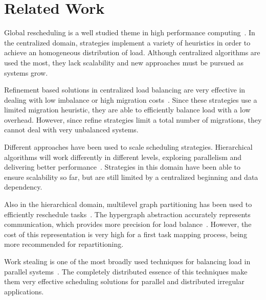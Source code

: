 \section{Related Work} \label{sec:rw}


Global rescheduling is a well studied theme in high performance computing~\cite{Deveci2015,grapevine,nuco,hybrid,ZoltanParHypRepart07,diffus,Zheng2010}. 
In the centralized domain, strategies implement a variety of heuristics in order to achieve an homogeneous distribution of load.
Although centralized algorithms are used the most, they lack scalability and new approaches must be pursued as systems grow.

Refinement based solutions in centralized load balancing are very effective in dealing with low imbalance or high migration costs~\cite{MenonPHD}. 
Since these strategies use a limited migration heuristic, they are able to efficiently balance load with a low overhead.
However, since refine strategies limit a total number of migrations, they cannot deal with very unbalanced systems.

Different approaches have been used to scale scheduling strategies.
Hierarchical algorithms will work differently in different levels, exploring parallelism and delivering better performance~\cite{nuco,hybrid,GengbinThesis}.
Strategies in this domain have been able to ensure scalability so far, but are still limited by a centralized beginning and data dependency.

Also in the hierarchical domain, multilevel graph partitioning has been used to efficiently reschedule tasks~\cite{ZoltanParHypRepart07}.
The hypergraph abstraction accurately represents communication, which provides more precision for load balance~\cite{commaware,Bathele2011graph}.
However, the cost of this representation is very high for a first task mapping process, being more recommended for repartitioning.

Work stealing is one of the most broadly used techniques for balancing load in parallel systems~\cite{DBLP:journals/ijpp/YangH18,Janjic2013}.
The completely distributed essence of this techniques make them very effective scheduling solutions for parallel and distributed irregular applications.

